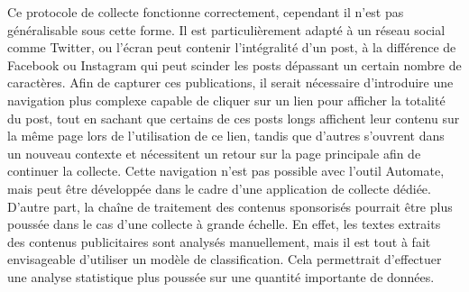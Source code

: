 \documentclass[runningheads]{llncs}
\begin{document}
Ce protocole de collecte fonctionne correctement, cependant il n'est pas généralisable sous cette forme. Il est particulièrement adapté à un réseau social comme Twitter, ou l'écran peut contenir l'intégralité d'un post, à la différence de Facebook ou Instagram qui peut scinder les posts dépassant un certain nombre de caractères. Afin de capturer ces publications, il serait nécessaire d'introduire une navigation plus complexe capable de cliquer sur un lien pour afficher la totalité du post, tout en sachant que certains de ces posts longs affichent leur contenu sur la même page lors de l'utilisation de ce lien, tandis que d'autres s'ouvrent dans un nouveau contexte et nécessitent un retour sur la page principale afin de continuer la collecte. Cette navigation n'est pas possible avec l'outil Automate, mais peut être développée dans le cadre d'une application de collecte dédiée.
D'autre part, la chaîne de traitement des contenus sponsorisés pourrait être plus poussée dans le cas d'une collecte à grande échelle. En effet, les textes extraits des contenus publicitaires sont analysés manuellement, mais il est tout à fait envisageable d'utiliser un modèle de classification. Cela permettrait d'effectuer une analyse statistique plus poussée sur une quantité importante de données.

\iffalse
Figure décrivant les différentes étapes
\fi



\end{document}
